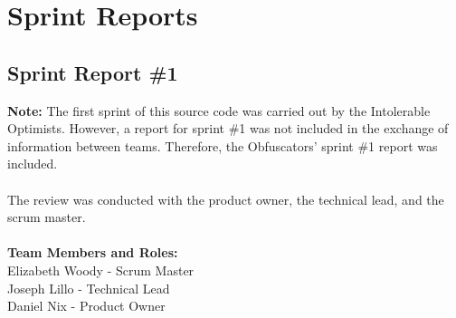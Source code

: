 
\chapter{Sprint Reports}



\section{Sprint Report \#1}
\textbf{Note:} The first sprint of this source code was carried out by the Intolerable Optimists. However, a report for sprint \#1 was not included in the exchange of information between teams. Therefore, the Obfuscators' sprint \#1 report was included.\\
\\The review was conducted with the product owner, the technical lead, and the scrum master.\\
\\ \textbf{Team Members and Roles:}
\\ Elizabeth Woody - Scrum Master
\\ Joseph Lillo - Technical Lead
\\ Daniel Nix - Product Owner


